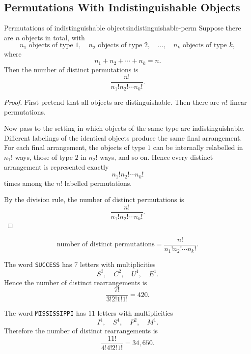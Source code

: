 \subsection{Permutations With Indistinguishable Objects}

\begin{theorem}{Permutations of indistinguishable objects}{indistinguishable-perm}
Suppose there are $n$ objects in total, with
\[
n_1\text{ objects of type }1,\quad
n_2\text{ objects of type }2,\quad
\dots,\quad
n_k\text{ objects of type }k,
\]
where
\[
n_1+n_2+\cdots+n_k=n.
\]
Then the number of distinct permutations is
\[
\frac{n!}{n_1!n_2!\cdots n_k!}.
\]
\end{theorem}

\begin{proof}
First pretend that all objects are distinguishable. Then there are $n!$ linear permutations.

Now pass to the setting in which objects of the same type are indistinguishable. Different labelings of the identical objects produce the same final arrangement. For each final arrangement, the objects of type $1$ can be internally relabelled in $n_1!$ ways, those of type $2$ in $n_2!$ ways, and so on. Hence every distinct arrangement is represented exactly
\[
n_1!n_2!\cdots n_k!
\]
times among the $n!$ labelled permutations.

By the division rule, the number of distinct permutations is
\[
\frac{n!}{n_1!n_2!\cdots n_k!}.
\]
\end{proof}

\begin{keyformula}[title={Indistinguishable objects}]
\[
\text{number of distinct permutations}
=
\frac{n!}{n_1!n_2!\cdots n_k!}.
\]
\end{keyformula}

\begin{examplebox}[title={The word SUCCESS}]
The word \texttt{SUCCESS} has $7$ letters with multiplicities
\[
S^3,\quad C^2,\quad U^1,\quad E^1.
\]
Hence the number of distinct rearrangements is
\[
\frac{7!}{3!2!1!1!}=420.
\]
\end{examplebox}

\begin{examplebox}[title={The word MISSISSIPPI}]
The word \texttt{MISSISSIPPI} has $11$ letters with multiplicities
\[
I^4,\quad S^4,\quad P^2,\quad M^1.
\]
Therefore the number of distinct rearrangements is
\[
\frac{11!}{4!4!2!1!}=34{,}650.
\]
\end{examplebox}

